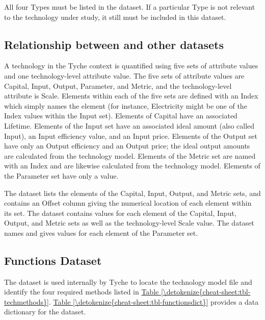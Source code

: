 \documentclass[letterpaper,10pt,english]{sphinxmanual}
\begin{document}
All four Types must be listed in the  dataset. If a particular Type is not relevant to the technology under study, it still must be included in this dataset.


\subsection{Relationship between  and other datasets}
\label{\detokenize{cheat-sheet:relationship-between-indices-and-other-datasets}}
A technology in the Tyche context is quantified using five sets of attribute values and one technology-level attribute value. The five sets of attribute values are Capital, Input, Output, Parameter, and Metric, and the technology-level attribute is Scale. Elements within each of the five sets are defined with an Index which simply names the element (for instance, Electricity might be one of the Index values within the Input set). Elements of Capital have an associated Lifetime. Elements of the Input set have an associated ideal amount (also called Input), an Input efficiency value, and an Input price. Elements of the Output set have only an Output efficiency and an Output price; the ideal output amounts are calculated from the technology model. Elements of the Metric set are named with an Index and are likewise calculated from the technology model. Elements of the Parameter set have only a value.

The  dataset lists the elements of the Capital, Input, Output, and Metric sets, and contains an Offset column giving the numerical location of each element within its set. The  dataset contains values for each element of the Capital, Input, Output, and Metric sets as well as the technology-level Scale value. The  dataset names and gives values for each element of the Parameter set.


\subsection{Functions Dataset}
\label{\detokenize{cheat-sheet:functions-dataset}}
The  dataset is used internally by Tyche to locate the technology model file and identify the four required methods listed in \hyperref[\detokenize{cheat-sheet:tbl-techmethods}]{Table \ref{\detokenize{cheat-sheet:tbl-techmethods}}}. \hyperref[\detokenize{cheat-sheet:tbl-functionsdict}]{Table \ref{\detokenize{cheat-sheet:tbl-functionsdict}}} provides a data dictionary for the  dataset.
\end{document}
